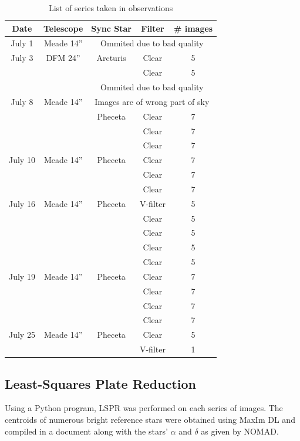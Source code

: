 \documentclass[12pt,journal,compsoc]{IEEEtran}
\begin{document}
\begin{table}[!t]
\centering
\begin{tabular}{|c|c|c|c|c|}
\hline
Date & Telescope & Sync Star & Filter & \# images \\ \hline \hline
July 1 &Meade 14''& \multicolumn{3}{c|}{Ommited due to bad quality}\\ \hline \hline
July 3 & DFM 24''& Arcturis  & Clear & 5 \\ \cline{4-5}
 & & & Clear & 5\\ \cline{3-5}
 & & \multicolumn{3}{c|}{Ommited due to bad quality} \\ \hline \hline
July 8 &  Meade 14''  &\multicolumn{3}{c|}{Images are of wrong part of sky} \\ \cline{3-5}
 & & Pheceta & Clear & 7 \\ \cline{4-5}
 & & & Clear & 7\\ \cline{4-5}
 & & & Clear & 7\\ \hline \hline
July 10 & Meade 14''& Pheceta  & Clear &7 \\ \cline{4-5}
 & & & Clear & 7\\ \cline{4-5}
 & & & Clear & 7\\ \hline \hline
July 16 & Meade 14''& Pheceta  & V-filter &5 \\ \cline{4-5}
 & & & Clear & 5\\ \cline{4-5}
 & & & Clear & 5\\ \cline{4-5}
 & & & Clear & 5\\ \cline{4-5}
 & & & Clear & 5\\ \hline \hline
July 19 & Meade 14''& Pheceta  & Clear &7 \\ \cline{4-5}
 & & & Clear & 7\\ \cline{4-5}
 & & & Clear & 7\\ \cline{4-5}
 & & & Clear & 7\\ \hline \hline
July 25 & Meade 14'' & Pheceta  & Clear &5 \\ \cline{4-5}
 & & & V-filter & 1\\ \hline 
\end{tabular}
\caption{List of series taken in observations \label{tab:serieslist}}
\end{table}

\subsection{Least-Squares Plate Reduction}
Using a Python program, LSPR was performed on each series of images.
The centroids of numerous bright reference stars were obtained using MaxIm DL and compiled in a document along with the stars' $\alpha$ and $\delta$ as given by NOMAD. 
\end{document}
